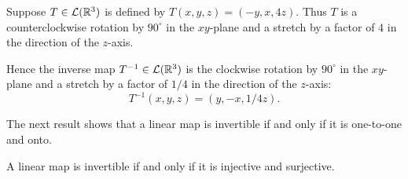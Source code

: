 \begin{example}\label{ax:3.62}
Suppose $T\in\mathcal{L}(\mathbb{R}^3)$ is defined by $T(x,y,z)=(-y,x,4z)$. Thus $T$ is a
counterclockwise rotation by $90^\circ$ in the $xy$-plane and a stretch by a
factor of $4$ in the direction of the $z$-axis.

Hence the inverse map $T^{-1}\in\mathcal{L}(\mathbb{R}^3)$ is the clockwise rotation by
$90^\circ$ in the $xy$-plane and a stretch by a factor of $1/4$ in the
direction of the $z$-axis:
\[ T^{-1}(x,y,z) = (y,-x,1/4z). \]
\end{example}

The next result shows that a linear map is invertible if and only if it is
one-to-one and onto.

\begin{result}\label{ax:3.63}
A linear map is invertible if and only if it is injective and surjective.
\end{result}

